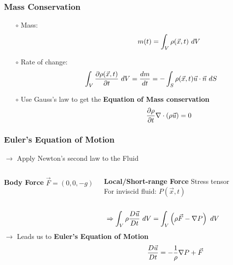 \documentclass[fleqn]{beamer}
\begin{document}
    \begin{frame}
        \frametitle{Mass Conservation}
        \begin{itemize}
            \item[$\circ$] Mass:
            \begin{align}
                \hspace{0.3\linewidth}
                m(t) = \int_V \rho(\vec{x}, t)\ dV \nonumber
            \end{align}
        \item[$\circ$] Rate of change:
            \begin{align}
                \hspace{0.15\linewidth}
                \int_V \frac{\partial \rho(\vec{x}, t)}{\partial t}\ dV = \frac{dm}{dt} =
                -\int_{S} \rho(\vec{x}, t) \vec{u}\cdot\vec{n}\ dS\nonumber
            \end{align}
        \item[$\circ$] Use Gauss's law to get the \textbf{Equation of Mass
            conservation}
            \begin{align}
                \hspace{0.3\linewidth} \frac{\partial \rho}{\partial t}
                \nabla \cdot (\rho \vec{u}) =
                0 \nonumber
            \end{align}
        \end{itemize}
    \end{frame}

    \begin{frame}
        \frametitle{Euler's Equation of Motion}
        \centering
        $\rightarrow$ Apply Newton's second law to the Fluid
        \begin{columns}
            \begin{block}{\centering\textbf{Body Force}}
                \centering
                $\vec{F} = (0, 0, -g)$
            \end{block}
            \begin{block}{\centering\textbf{Local/Short-range Force}}
                \centering
                Stress tensor\\
                For inviscid fluid: $P(\vec{x},t)$
            \end{block}
        \end{columns}
        \begin{align}
            \hspace{0.3\linewidth}\Rightarrow\int_V \rho \frac{D\vec{u}}{Dt}\ dV =
            \int_V \left( \rho \vec{F} - \nabla P \right)\ dV\nonumber
        \end{align}
        \centering
        $\rightarrow$ Leads us to \textbf{Euler's Equation of Motion}
        \begin{align}
            \hspace{0.4\linewidth} \frac{D\vec{u}}{Dt} =-
            \frac{1}{\rho}\nabla P + \vec{F}  \nonumber
        \end{align}
    \end{frame}
\end{document}
